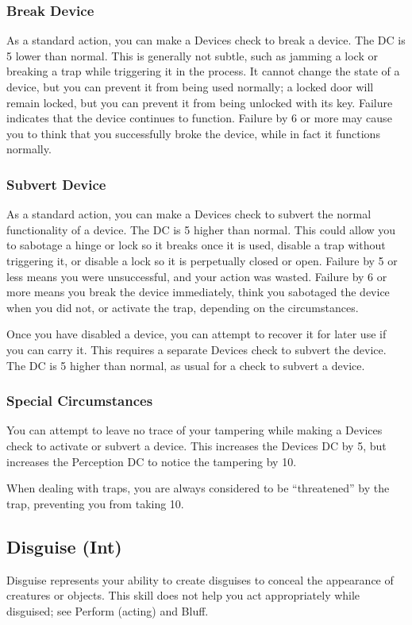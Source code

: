 \subsubsection{Break Device}
As a standard action, you can make a Devices check to break a device. The DC is 5 lower than normal. This is generally not subtle, such as jamming a lock or breaking a trap while triggering it in the process. It cannot change the state of a device, but you can prevent it from being used normally; a locked door will remain locked, but you can prevent it from being unlocked with its key. Failure indicates that the device continues to function. Failure by 6 or more may cause you to think that you successfully broke the device, while in fact it functions normally.

\subsubsection{Subvert Device}
As a standard action, you can make a Devices check to subvert the normal functionality of a device. The DC is 5 higher than normal. This could allow you to sabotage a hinge or lock so it breaks once it is used, disable a trap without triggering it, or disable a lock so it is perpetually closed or open. Failure by 5 or less means you were unsuccessful, and your action was wasted. Failure by 6 or more means you break the device immediately, think you sabotaged the device when you did not, or activate the trap, depending on the circumstances.

Once you have disabled a device, you can attempt to recover it for later use if you can carry it. This requires a separate Devices check to subvert the device. The DC is 5 higher than normal, as usual for a check to subvert a device.

\subsubsection{Special Circumstances}

You can attempt to leave no trace of your tampering while making a Devices check to activate or subvert a device. This increases the Devices DC by 5, but increases the Perception DC to notice the tampering by 10.

When dealing with traps, you are always considered to be ``threatened'' by the trap, preventing you from taking 10.


\subsection{Disguise (Int)}
Disguise represents your ability to create disguises to conceal the appearance of creatures or objects. This skill does not help you act appropriately while disguised; see Perform (acting) and Bluff.

